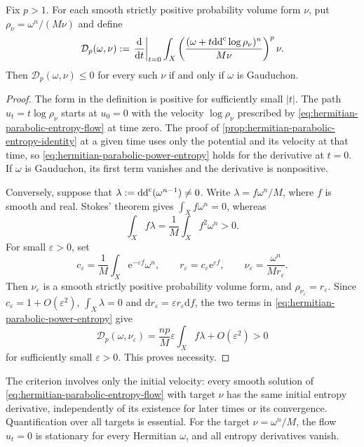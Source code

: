 \begin{proposition}\label{prop:gauduchon-initial-entropy-criterion}
Fix $p>1$. For each smooth strictly positive probability volume form $\nu$, put $\rho_\nu=\omega^n/(M\nu)$ and define
\[
 \mathcal D_p(\omega,\nu)
 :=\left.\frac{\mathrm{d}}{\mathrm{d}t}\right|_{t=0}
   \int_X\left(\frac{(\omega+t\mathrm{dd}^{\mathrm{c}}\log\rho_\nu)^n}{M\nu}\right)^p\nu.
\]
Then $\mathcal D_p(\omega,\nu)\leq0$ for every such $\nu$ if and only if $\omega$ is Gauduchon.
\end{proposition}
\begin{proof}
The form in the definition is positive for sufficiently small $|t|$. The path $u_t=t\log\rho_\nu$ starts at $u_0=0$ with the velocity $\log\rho_\nu$ prescribed by \eqref{eq:hermitian-parabolic-entropy-flow} at time zero. The proof of \cref{prop:hermitian-parabolic-entropy-identity} at a given time uses only the potential and its velocity at that time, so \eqref{eq:hermitian-parabolic-power-entropy} holds for the derivative at $t=0$. If $\omega$ is Gauduchon, its first term vanishes and the derivative is nonpositive.

Conversely, suppose that $\lambda:=\mathrm{dd}^{\mathrm{c}}(\omega^{n-1})\ne0$. Write $\lambda=f\omega^n/M$, where $f$ is smooth and real. Stokes' theorem gives $\int_Xf\omega^n=0$, whereas
\[
 \int_Xf\lambda=\frac1M\int_Xf^2\omega^n>0.
\]
For small $\varepsilon>0$, set
\[
 c_\varepsilon=\frac1M\int_X\mathrm{e}^{-\varepsilon f}\omega^n,
 \qquad r_\varepsilon=c_\varepsilon\mathrm{e}^{\varepsilon f},
 \qquad \nu_\varepsilon=\frac{\omega^n}{M r_\varepsilon}.
\]
Then $\nu_\varepsilon$ is a smooth strictly positive probability volume form, and $\rho_{\nu_\varepsilon}=r_\varepsilon$. Since $c_\varepsilon=1+O(\varepsilon^2)$, $\int_X\lambda=0$ and $\mathrm{d}r_\varepsilon=\varepsilon r_\varepsilon\mathrm{d}f$, the two terms in \eqref{eq:hermitian-parabolic-power-entropy} give
\[
 \mathcal D_p(\omega,\nu_\varepsilon)
 =\frac{np}M\varepsilon\int_Xf\lambda+O(\varepsilon^2)>0
\]
for sufficiently small $\varepsilon>0$. This proves necessity.
\end{proof}

The criterion involves only the initial velocity: every smooth solution of \eqref{eq:hermitian-parabolic-entropy-flow} with target $\nu$ has the same initial entropy derivative, independently of its existence for later times or its convergence. Quantification over all targets is essential. For the target $\nu=\omega^n/M$, the flow $u_t=0$ is stationary for every Hermitian $\omega$, and all entropy derivatives vanish.

